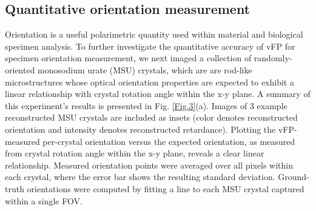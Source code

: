 \documentclass{article}
\begin{document}
 \subsection{Quantitative orientation measurement}
 
 Orientation is a useful polarimetric quantity used within material and biological specimen analysis. To further investigate the quantitative accuracy of vFP for specimen orientation measurement, we next imaged a collection of randomly-oriented monosodium urate (MSU) crystals, which are are rod-like microstructures whose optical orientation properties are expected to exhibit a linear relationship with crystal rotation angle within the x-y plane. A summary of this experiment's results is presented in Fig. \ref{Fig.3}(a). Images of 3 example reconstructed MSU crystals are included as insets (color denotes reconstructed orientation and intensity denotes reconstructed retardance). Plotting the vFP-measured per-crystal orientation versus the expected orientation, as measured from crystal rotation angle within the x-y plane, reveals a clear linear relationship. Measured orientation points were averaged over all pixels within each crystal, where the error bar shows the resulting standard deviation. Ground-truth orientations were computed by fitting a line to each MSU crystal captured within a single FOV. 
\end{document}
